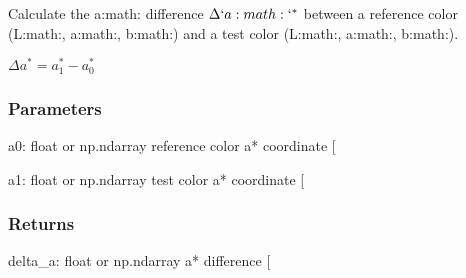 \documentclass[letterpaper,10pt,english]{sphinxmanual}
\begin{document}
\begin{fulllineitems}
\label{\detokenize{07_colors:skinoptics.colors.Delta_a}}
\pysigstartsignatures
{}
\pysigstopsignatures
\sphinxAtStartPar
Calculate the a:math:\sphinxtitleref{\textasciicircum{}*} difference \(\Delta`a:math:`^*\) between
a reference color (L:math:, a:math:, b:math:) and
a test color (L:math:, a:math:, b:math:).

\sphinxAtStartPar
\(\Delta a^* = a^*_1 - a^*_0\)


\subsubsection{Parameters}
\label{\detokenize{07_colors:id3}}
\sphinxAtStartPar
a0: float or np.ndarray
reference color a* coordinate {[}\sphinxhyphen{}{]}

\sphinxAtStartPar
a1: float or np.ndarray
test color a* coordinate {[}\sphinxhyphen{}{]}


\subsubsection{Returns}
\label{\detokenize{07_colors:id4}}
\sphinxAtStartPar
delta\_a: float or np.ndarray
a* difference {[}\sphinxhyphen{}{]}

\end{fulllineitems}

\end{document}
